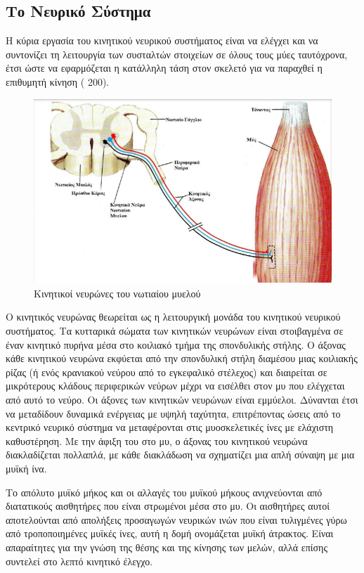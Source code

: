 \subsection{Το Νευρικό Σύστημα}

Η κύρια εργασία του κινητικού νευρικού συστήματος είναι να ελέγχει και να συντονίζει τη λειτουργία των συσταλτών στοιχείων σε όλους τους μύες ταυτόχρονα, έτσι ώστε να εφαρμόζεται η κατάλληλη τάση στον σκελετό για να παραχθεί η επιθυμητή κίνηση ( 200).

\begin{figure}[H]
    \centering
    \includegraphics[width=.8\textwidth]{musculoskeletal/fig/muscle-fysiology4.png}
    \caption{Κινητικοί νευρώνες του νωτιαίου μυελού\protect\footnotemark}
    \label{fig:muscle-fysiology4}
\end{figure}

Ο κινητικός νευρώνας θεωρείται ως η λειτουργική μονάδα του κινητικού νευρικού συστήματος. Τα κυτταρικά σώματα των κινητικών νευρώνων είναι στοιβαγμένα σε έναν κινητικό πυρήνα μέσα στο κοιλιακό τμήμα της σπονδυλικής στήλης. Ο άξονας κάθε κινητικού νευρώνα εκφύεται από την σπονδυλική στήλη διαμέσου μιας κοιλιακής ρίζας (ή ενός κρανιακού νεύρου από το εγκεφαλικό στέλεχος) και διαιρείται σε μικρότερους κλάδους περιφερικών νεύρων μέχρι να εισέλθει στον μυ που ελέγχεται από αυτό το νεύρο. Οι άξονες των κινητικών νευρώνων είναι εμμύελοι. Δύνανται έτσι να μεταδίδουν δυναμικά ενέργειας με υψηλή ταχύτητα, επιτρέποντας ώσεις από το κεντρικό νευρικό σύστημα να μεταφέρονται στις μυοσκελετικές ίνες με ελάχιστη καθυστέρηση. Με την άφιξη του στο μυ, ο άξονας του κινητικού νευρώνα διακλαδίζεται πολλαπλά, με κάθε διακλάδωση να σχηματίζει μια απλή σύναψη με μια μυϊκή ίνα.

Το απόλυτο μυϊκό μήκος και οι αλλαγές του μυϊκού μήκους ανιχνεύονται από διατατικούς αισθητήρες που είναι στρωμένοι μέσα στο μυ. Οι αισθητήρες αυτοί αποτελούνται από απολήξεις προσαγωγών νευρικών ινών που είναι τυλιγμένες γύρω από τροποποιημένες μυϊκές ίνες, αυτή η δομή ονομάζεται μυϊκή άτρακτος. Είναι απαραίτητες για την γνώση της θέσης και της κίνησης των μελών, αλλά επίσης συντελεί στο λεπτό κινητικό έλεγχο.

